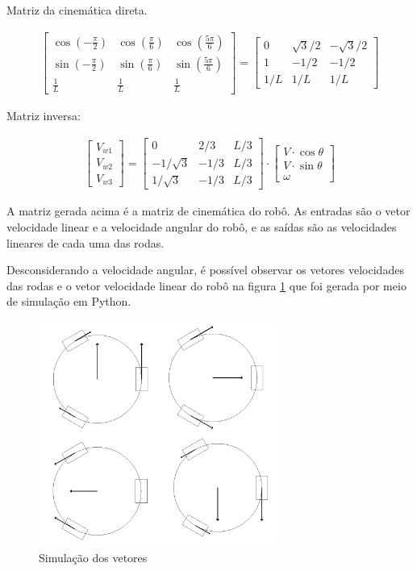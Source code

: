 Matriz da cinemática direta.

\begin{gather}
	\begin{bmatrix}
		\cos{\left(-\frac{\pi}{2}\right)} & \cos{\left(\frac{\pi}{6}\right)} & \cos{\left(\frac{5\pi}{6}\right)} \\
		\sin{\left(-\frac{\pi}{2}\right)} & \sin{\left(\frac{\pi}{6}\right)} & \sin{\left(\frac{5\pi}{6}\right)} \\
		\frac{1}{L} & \frac{1}{L} & \frac{1}{L}
	\end{bmatrix}
	=
	\begin{bmatrix}
		0 & \sqrt{3}/2 & -\sqrt{3}/2 \\
		1 & -1/2 & -1/2  \\
		1/L & 1/L & 1/L
	\end{bmatrix}
\end{gather}



Matriz inversa:


\begin{gather}
	\begin{bmatrix} V_{w1} \\  V_{w2} \\  V_{w3} \end{bmatrix}
	=
	\begin{bmatrix}
		0 & 2/3 & L/3 \\
		-1/\sqrt{3} & -1/3 & L/3\\
		1/\sqrt{3} & -1/3 & L/3
	\end{bmatrix}
	\cdot
	\begin{bmatrix} V\cdot \cos{\theta} \\  V\cdot \sin{\theta} \\  \omega \end{bmatrix}
\end{gather}


A matriz gerada acima é a matriz de cinemática do robô.
As entradas são o vetor velocidade linear e a velocidade angular do robô, e as
saídas são as velocidades lineares de cada uma das rodas.

Desconsiderando a velocidade angular, é possível observar os vetores velocidades
 das rodas e o vetor velocidade linear do robô na figura \ref{simulacao} que foi
 gerada por meio de simulação em Python.

\begin{figure}[h]
	\centering
	\includegraphics[width=0.7\textwidth]{figures/simulacao}
	\caption{Simulação dos vetores}
	\label{simulacao}
\end{figure}